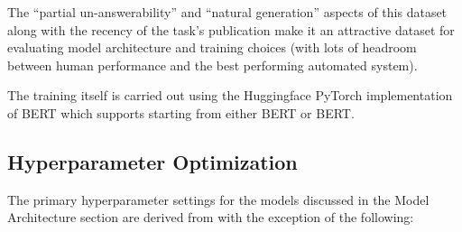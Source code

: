 \documentclass[letterpaper]{article} \usepackage{aaai20}  \usepackage{times}  \usepackage{helvet} \usepackage{courier}  \usepackage[hyphens]{url}  \usepackage{graphicx} \urlstyle{rm} \def\UrlFont{\rm}  \usepackage{graphicx}  \frenchspacing  \setlength{\pdfpagewidth}{8.5in}  \setlength{\pdfpageheight}{11in}  \usepackage{amsmath}
\newcommand{\bertbase}{BERT}
\newcommand{\bertlarge}{BERT}
\begin{document}
The ``partial un-answerability'' and ``natural generation'' aspects of this dataset along with the recency of the task's publication make it an attractive dataset for evaluating model architecture and training choices (with lots of headroom between human performance and the best performing automated system).

The training itself is carried out using the Huggingface PyTorch implementation of BERT which supports starting from either \bertbase{} or \bertlarge{}. 







\subsection{Hyperparameter Optimization}
\label{subsec:hypopt}
The primary hyperparameter settings for the models discussed in the Model Architecture section are derived from \cite{alberti2019bert} with the exception of the following:
\end{document}
